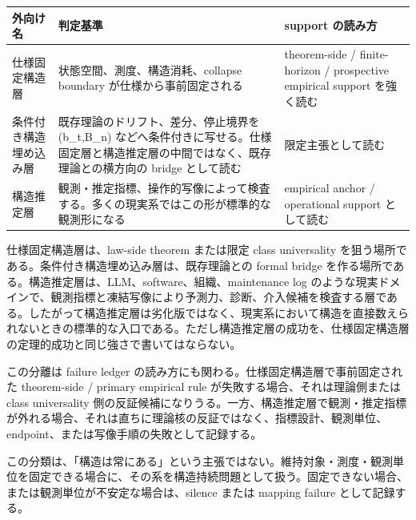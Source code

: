 \documentclass[12pt,a4paper]{article}
\begin{document}
{\def\LTcaptype{table} %
\begin{longtable}[]{@{}
  >{\raggedright\arraybackslash}p{}
  >{\raggedright\arraybackslash}p{}
  >{\raggedright\arraybackslash}p{}@{}}
\toprule\noalign{}
\begin{minipage}[b]{\linewidth}\raggedright
外向け名
\end{minipage} & \begin{minipage}[b]{\linewidth}\raggedright
判定基準
\end{minipage} & \begin{minipage}[b]{\linewidth}\raggedright
support の読み方
\end{minipage} \\
\midrule\noalign{}
\endhead
\bottomrule\noalign{}
\endlastfoot
仕様固定構造層 & 状態空間、測度、構造消耗、collapse boundary が仕様から事前固定される & theorem-side / finite-horizon / prospective empirical support を強く読む \\
条件付き構造埋め込み層 & 既存理論のドリフト、差分、停止境界を (b\_t,B\_n) などへ条件付きに写せる。仕様固定層と構造推定層の中間ではなく、既存理論との横方向の bridge として読む & 限定主張として読む \\
構造推定層 & 観測・推定指標、操作的写像によって検査する。多くの現実系ではこの形が標準的な観測形になる & empirical anchor / operational support として読む \\
\end{longtable}
}

仕様固定構造層は、law-side theorem または限定 class universality を狙う場所である。条件付き構造埋め込み層は、既存理論との formal bridge を作る場所である。構造推定層は、LLM、software、組織、maintenance log のような現実ドメインで、観測指標と凍結写像により予測力、診断、介入候補を検査する層である。したがって構造推定層は劣化版ではなく、現実系において構造を直接数えられないときの標準的な入口である。ただし構造推定層の成功を、仕様固定構造層の定理的成功と同じ強さで書いてはならない。

この分離は failure ledger の読み方にも関わる。仕様固定構造層で事前固定された theorem-side / primary empirical rule が失敗する場合、それは理論側または class universality 側の反証候補になりうる。一方、構造推定層で観測・推定指標が外れる場合、それは直ちに理論核の反証ではなく、指標設計、観測単位、endpoint、または写像手順の失敗として記録する。

この分類は、「構造は常にある」という主張ではない。維持対象・測度・観測単位を固定できる場合に、その系を構造持続問題として扱う。固定できない場合、または観測単位が不安定な場合は、silence または mapping failure として記録する。
\end{document}
